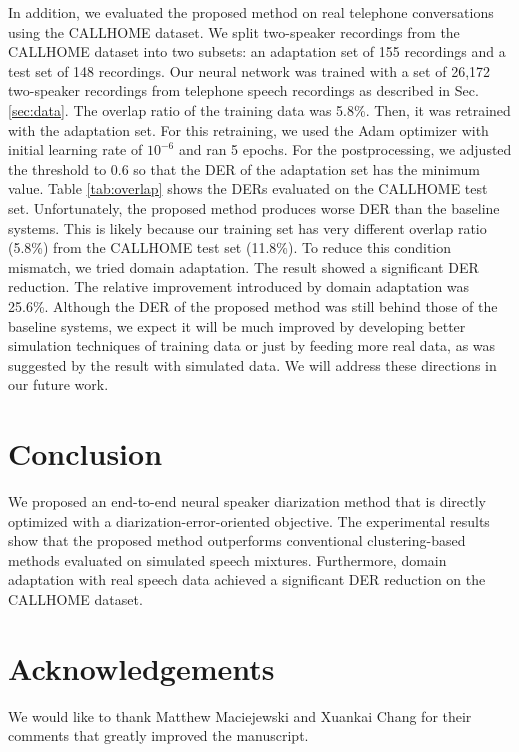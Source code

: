 \documentclass[a4paper]{article}
\begin{document}
In addition,
we evaluated the proposed method on real telephone conversations using the CALLHOME dataset.
We split two-speaker recordings from the CALLHOME dataset into two subsets: an adaptation set of 155 recordings and a test set of 148 recordings.
Our neural network was trained with a set of 26,172 two-speaker recordings from telephone speech recordings as described in Sec.\ref{sec:data}. The overlap ratio of the training data was 5.8\%.
Then, it was retrained with the adaptation set.
For this retraining, we used the Adam optimizer with initial learning rate of $10^{-6}$ and ran 5 epochs.
For the postprocessing, we adjusted the threshold to 0.6 so that the DER of the adaptation set has the minimum value.
Table \ref{tab:overlap} shows the DERs evaluated on the CALLHOME test set.
Unfortunately, the proposed method produces worse DER than the baseline systems.
This is likely because our training set has very different overlap ratio (5.8\%) from the CALLHOME test set (11.8\%).
To reduce this condition mismatch, we tried domain adaptation.
The result showed a significant DER reduction.
The relative improvement introduced by domain adaptation was 25.6\%.
Although the DER of the proposed method was still behind those of the baseline systems, we expect it will be much improved by developing better simulation techniques of training data or just by feeding more real data, as was suggested by the result with simulated data.
We will address these directions in our future work.







\section{Conclusion}

We proposed an end-to-end neural speaker diarization method that is directly optimized with a diarization-error-oriented objective.
The experimental results show that the proposed method outperforms conventional clustering-based methods evaluated on simulated speech mixtures.
Furthermore, domain adaptation with real speech data achieved a significant DER reduction on the CALLHOME dataset.

\section{Acknowledgements}

We would like to thank Matthew Maciejewski and Xuankai Chang for their
comments that greatly improved the manuscript.




\end{document}
